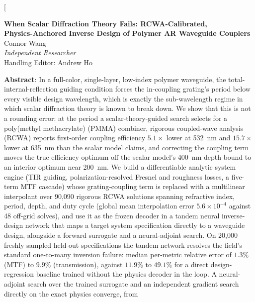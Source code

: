 \documentclass[10pt,twocolumn]{article}
\begin{document}
\twocolumn[
\begin{@twocolumnfalse}
\begin{center}
{\LARGE\bfseries When Scalar Diffraction Theory Fails: RCWA-Calibrated,\\[2pt]
Physics-Anchored Inverse Design of Polymer AR Waveguide Couplers\\[10pt]}
{\large Connor Wang\\[2pt]}
{\normalsize\itshape Independent Researcher\\[4pt]}
{\footnotesize Handling Editor: Andrew Ho\\[8pt]}
\end{center}

\begin{center}
\begin{minipage}{0.92\textwidth}
\small
\textbf{Abstract}: In a full-color, single-layer, low-index polymer
waveguide, the total-internal-reflection guiding condition forces the
in-coupling grating's period below every visible design wavelength, which
is exactly the sub-wavelength regime in which scalar diffraction theory is
known to break down. We show that this is not a rounding error: at the
period a scalar-theory-guided search selects for a poly(methyl
methacrylate) (PMMA) combiner, rigorous coupled-wave analysis (RCWA)
reports first-order coupling efficiency $5.1\times$ lower at 532~nm and
$15.7\times$ lower at 635~nm than the scalar model claims, and correcting
the coupling term moves the true efficiency optimum off the scalar model's
400~nm depth bound to an interior optimum near 200~nm. We build a
differentiable analytic system engine (TIR guiding, polarization-resolved
Fresnel and roughness losses, a five-term MTF cascade) whose grating-coupling
term is replaced with a multilinear interpolant over 90,090 rigorous RCWA
solutions spanning refractive index, period, depth, and duty cycle (global
mean interpolation error $5.6\times10^{-4}$ against 48 off-grid solves), and
use it as the frozen decoder in a tandem neural inverse-design network that
maps a target system specification directly to a waveguide design, alongside
a forward surrogate and a neural-adjoint search. On 20{,}000 freshly sampled
held-out specifications the tandem network resolves the field's standard
one-to-many inversion failure: median per-metric relative error of $1.3\%$
(MTF) to $9.9\%$ (transmission), against $11.9\%$ to $49.1\%$ for a
direct design-regression baseline trained without the physics decoder in
the loop. A neural-adjoint search over the trained surrogate and an
independent gradient search directly on the exact physics converge, from

\end{minipage}
\end{center}
\end{@twocolumnfalse}
\end{document}
